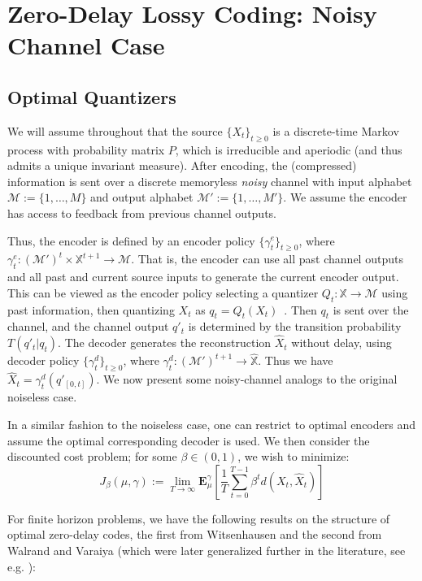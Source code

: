 \documentclass[conference]{IEEEtran}
\begin{document}
\section{Zero-Delay Lossy Coding: Noisy Channel Case}\label{section:optimal quantizers}
\subsection{Optimal Quantizers}
We will assume throughout that the source \( \{X_t\}_{t \ge 0} \) is a discrete-time Markov process with probability matrix \( P \), which is irreducible and aperiodic (and thus admits a unique invariant measure). After encoding, the (compressed) information is sent over a discrete memoryless \emph{noisy} channel with input alphabet \( \mathcal{M} := \{1,\ldots,M\} \) and output alphabet \(\mathcal{M}' := \{1, \ldots, M'\}\). We assume the encoder has access to feedback from previous channel outputs.

Thus, the encoder is defined by an encoder policy \( \{\gamma^e_t\}_{t \ge 0} \), where \( \gamma^e_t : (\mathcal{M'})^t \times \mathbb{X}^{t+1} \to \mathcal{M} \). That is, the encoder can use all past channel outputs and all past and current source inputs to generate the current encoder output. This can be viewed as the encoder policy selecting a quantizer \( Q_t : \mathbb{X} \to \mathcal{M} \) using past information, then quantizing \( X_t \) as \( q_t = Q_t(X_t) \)~\cite{Linder}. Then \(q_t\) is sent over the channel, and the channel output \(q'_t\) is determined by the transition probability \(T(q'_t | q_t)\). The decoder generates the reconstruction \( \hat{X}_t \) without delay, using decoder policy \( \{\gamma^d_t\}_{t \ge 0} \), where \( \gamma^d_t : (\mathcal{M'})^{t+1} \to \hat{\mathbb{X}} \). Thus we have \( \hat{X}_t = \gamma^d_t(q'_{[0,t]}) \). We now present some noisy-channel analogs to the original noiseless case.

In a similar fashion to the noiseless case, one can restrict to optimal encoders and assume the optimal corresponding decoder is used. We then consider the discounted cost problem; for some \( \beta \in (0,1) \), we wish to minimize:
\[ J_{\beta}(\mu, \gamma) := \lim_{T\to\infty}\mathbf{E}_{\mu}^{\gamma}\left[\frac{1}{T}\sum_{t=0}^{T-1}\beta^t d(X_t,\hat{X}_t)\right]\label{eq:discounted_cost} \]

For finite horizon problems, we have the following results on the structure of optimal zero-delay codes, the first from Witsenhausen and the second from Walrand and Varaiya (which were later generalized further in the literature, see e.g. \cite{MahTen09,Teneketzis,YukIT2010arXiv}):
\end{document}
